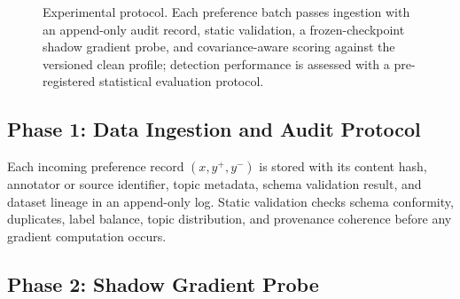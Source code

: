 \documentclass[runningheads]{llncs}
\begin{document}
\begin{figure}[t]
\centering
{}
\caption{Experimental protocol. Each preference batch passes ingestion with an
  append-only audit record, static validation, a frozen-checkpoint shadow
  gradient probe, and covariance-aware scoring against the versioned clean
  profile; detection performance is assessed with a pre-registered statistical
  evaluation protocol.}
\label{fig:pipeline}
\end{figure}

\subsection{Phase 1: Data Ingestion and Audit Protocol}

Each incoming preference record $(x, y^+, y^-)$ is stored with its content
hash, annotator or source identifier, topic metadata, schema validation result,
and dataset lineage in an append-only log. Static validation checks schema
conformity, duplicates, label balance, topic distribution, and provenance
coherence before any gradient computation occurs.

\subsection{Phase 2: Shadow Gradient Probe}
\end{document}
